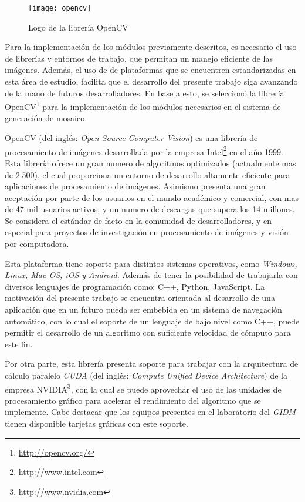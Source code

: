 \begin{wrapfigure}{R}{5cm}
	\begin{center}
		\vspace*{-0.2in}
		\texttt{[image: opencv]}
	\end{center}
	\caption{Logo de la librería OpenCV}
\end{wrapfigure}

Para la implementación de los módulos previamente descritos, es necesario el uso de librerías y entornos de trabajo, que permitan un manejo eficiente de las imágenes. Además, el uso de de plataformas que se encuentren estandarizadas en esta área de estudio, facilita que el desarrollo del presente trabajo siga avanzando de la mano de futuros desarrolladores. En base a esto, se seleccionó la librería OpenCV\footnote{\url{http://opencv.org/}} para la implementación de los módulos necesarios en el sistema de generación de mosaico.

OpenCV (del inglés: \textit{Open Source Computer Vision}) es una librería de procesamiento de imágenes desarrollada por la empresa Intel\footnote{\url{http://www.intel.com}} en el año 1999. Esta librería ofrece un gran numero de algoritmos optimizados (actualmente mas de 2.500), el cual proporciona un entorno de desarrollo altamente eficiente para aplicaciones de procesamiento de imágenes. Asimismo presenta una gran aceptación por parte de los usuarios en el mundo académico y comercial, con mas de 47 mil usuarios activos, y un numero de descargas que supera los 14 millones. Se considera el estándar de facto en la comunidad de desarrolladores, y en especial para proyectos de investigación en procesamiento de imágenes y visión por computadora. 

Esta plataforma tiene soporte para distintos sistemas operativos, como \textit{Windows, Linux, Mac OS, iOS y Android.} Además de tener la posibilidad de trabajarla con diversos lenguajes de programación como: C++, Python, JavaScript. La motivación del presente trabajo se encuentra orientada al desarrollo de una aplicación que en un futuro pueda ser embebida en un sistema de navegación automático, con lo cual el soporte de un lenguaje de bajo nivel como C++, puede permitir el desarrollo de un algoritmo con suficiente velocidad de cómputo para este fin.

Por otra parte, esta librería presenta soporte para trabajar con la arquitectura de cálculo paralelo \textit{CUDA} (del inglés: \textit{Compute Unified Device Architecture}) de la empresa NVIDIA\footnote{\url{http://www.nvidia.com}}, con la cual se puede aprovechar el uso de las unidades de procesamiento gráfico para acelerar el rendimiento del algoritmo que se implemente. Cabe destacar que los equipos presentes en el laboratorio del \textit{GIDM} tienen disponible tarjetas gráficas con este soporte.

